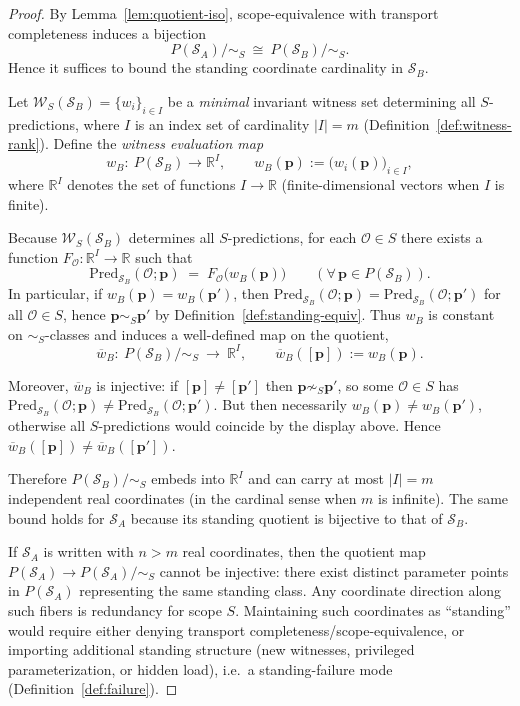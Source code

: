 \documentclass[11pt]{article}
\theoremstyle{remark}
\newcommand{\Skin}{\mathcal{S}}
\newcommand{\Wit}{\mathcal{W}}
\begin{document}
\begin{proof}
By Lemma~\ref{lem:quotient-iso}, scope-equivalence with transport completeness induces a bijection
\[
P(\Skin_A)/\!\sim_S\ \cong\ P(\Skin_B)/\!\sim_S.
\]
Hence it suffices to bound the standing coordinate cardinality in $\Skin_B$.

Let $\Wit_S(\Skin_B)=\{w_i\}_{i\in I}$ be a \emph{minimal} invariant witness set determining all $S$-predictions,
where $I$ is an index set of cardinality $|I|=m$ (Definition~\ref{def:witness-rank}).
Define the \emph{witness evaluation map}
\[
w_B:\ P(\Skin_B)\longrightarrow \mathbb{R}^{I},\qquad
w_B(\mathbf{p}) := \big(w_i(\mathbf{p})\big)_{i\in I},
\]
where $\mathbb{R}^{I}$ denotes the set of functions $I\to\mathbb{R}$ (finite-dimensional vectors when $I$ is finite).

Because $\Wit_S(\Skin_B)$ determines all $S$-predictions, for each $\mathcal{O}\in S$ there exists a function
$F_{\mathcal{O}}:\mathbb{R}^{I}\to\mathbb{R}$ such that
\[
\mathrm{Pred}_{\Skin_B}(\mathcal{O};\mathbf{p}) \;=\; F_{\mathcal{O}}\!\big(w_B(\mathbf{p})\big)
\qquad (\forall\,\mathbf{p}\in P(\Skin_B)).
\]
In particular, if $w_B(\mathbf{p})=w_B(\mathbf{p}')$, then $\mathrm{Pred}_{\Skin_B}(\mathcal{O};\mathbf{p})
=\mathrm{Pred}_{\Skin_B}(\mathcal{O};\mathbf{p}')$ for all $\mathcal{O}\in S$, hence
$\mathbf{p}\sim_S\mathbf{p}'$ by Definition~\ref{def:standing-equiv}.
Thus $w_B$ is constant on $\sim_S$-classes and induces a well-defined map on the quotient,
\[
\overline w_B:\ P(\Skin_B)/\!\sim_S\ \longrightarrow\ \mathbb{R}^{I},
\qquad \overline w_B([\mathbf{p}]):=w_B(\mathbf{p}).
\]

Moreover, $\overline w_B$ is injective: if $[\mathbf{p}]\neq[\mathbf{p}']$ then $\mathbf{p}\not\sim_S\mathbf{p}'$,
so some $\mathcal{O}\in S$ has $\mathrm{Pred}_{\Skin_B}(\mathcal{O};\mathbf{p})\neq
\mathrm{Pred}_{\Skin_B}(\mathcal{O};\mathbf{p}')$.
But then necessarily $w_B(\mathbf{p})\neq w_B(\mathbf{p}')$, otherwise all $S$-predictions would coincide by the
display above. Hence $\overline w_B([\mathbf{p}])\neq \overline w_B([\mathbf{p}'])$.

Therefore $P(\Skin_B)/\!\sim_S$ embeds into $\mathbb{R}^{I}$ and can carry at most $|I|=m$ independent real
coordinates (in the cardinal sense when $m$ is infinite). The same bound holds for $\Skin_A$ because its
standing quotient is bijective to that of $\Skin_B$.

If $\Skin_A$ is written with $n>m$ real coordinates, then the quotient map
$P(\Skin_A)\to P(\Skin_A)/\!\sim_S$ cannot be injective: there exist distinct parameter points in $P(\Skin_A)$
representing the same standing class. Any coordinate direction along such fibers is redundancy for scope $S$.
Maintaining such coordinates as ``standing'' would require either denying transport completeness/scope-equivalence,
or importing additional standing structure (new witnesses, privileged parameterization, or hidden load),
i.e.\ a standing-failure mode (Definition~\ref{def:failure}).
\end{proof}
\end{document}
